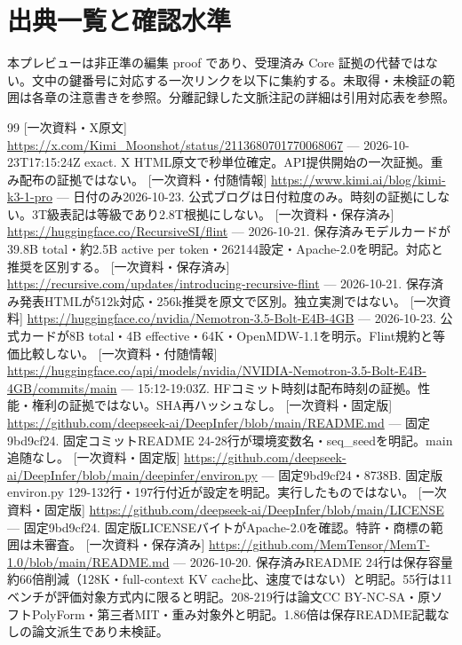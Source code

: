 \documentclass[lualatex,a4paper,10pt]{jlreq}
\begin{document}
\clearpage
\section*{出典一覧と確認水準}
本プレビューは非正準の編集 proof であり、受理済み Core 証拠の代替ではない。文中の鍵番号に対応する一次リンクを以下に集約する。未取得・未検証の範囲は各章の注意書きを参照。分離記録した文脈注記の詳細は引用対応表を参照。

{\footnotesize\setlength{\itemsep}{2pt}\setlength{\parsep}{0pt}
{\footnotesize\setlength{\itemsep}{2pt}\setlength{\parsep}{0pt}
\begin{thebibliography}{99}
 [一次資料・X原文] \url{https://x.com/Kimi_Moonshot/status/2113680701770068067} --- 2026-10-23T17:15:24Z exact. X HTML原文で秒単位確定。API提供開始の一次証拠。重み配布の証拠ではない。
 [一次資料・付随情報] \url{https://www.kimi.ai/blog/kimi-k3-1-pro} --- 日付のみ2026-10-23. 公式ブログは日付粒度のみ。時刻の証拠にしない。3T級表記は等級であり2.8T根拠にしない。
 [一次資料・保存済み] \url{https://huggingface.co/RecursiveSI/flint} --- 2026-10-21. 保存済みモデルカードが39.8B total・約2.5B active per token・262144設定・Apache-2.0を明記。対応と推奨を区別する。
 [一次資料・保存済み] \url{https://recursive.com/updates/introducing-recursive-flint} --- 2026-10-21. 保存済み発表HTMLが512k対応・256k推奨を原文で区別。独立実測ではない。
 [一次資料] \url{https://huggingface.co/nvidia/Nemotron-3.5-Bolt-E4B-4GB} --- 2026-10-23. 公式カードが8B total・4B effective・64K・OpenMDW-1.1を明示。Flint規約と等価比較しない。
 [一次資料・付随情報] \url{https://huggingface.co/api/models/nvidia/NVIDIA-Nemotron-3.5-Bolt-E4B-4GB/commits/main} --- 15:12-19:03Z. HFコミット時刻は配布時刻の証拠。性能・権利の証拠ではない。SHA再ハッシュなし。
 [一次資料・固定版] \url{https://github.com/deepseek-ai/DeepInfer/blob/main/README.md} --- 固定9bd9cf24. 固定コミットREADME 24-28行が環境変数名・seq\_seedを明記。main追随なし。
 [一次資料・固定版] \url{https://github.com/deepseek-ai/DeepInfer/blob/main/deepinfer/environ.py} --- 固定9bd9cf24・8738B. 固定版environ.py 129-132行・197行付近が設定を明記。実行したものではない。
 [一次資料・固定版] \url{https://github.com/deepseek-ai/DeepInfer/blob/main/LICENSE} --- 固定9bd9cf24. 固定版LICENSEバイトがApache-2.0を確認。特許・商標の範囲は未審査。
 [一次資料・保存済み] \url{https://github.com/MemTensor/MemT-1.0/blob/main/README.md} --- 2026-10-20. 保存済みREADME 24行は保存容量約66倍削減（128K・full-context KV cache比、速度ではない）と明記。55行は11ベンチが評価対象方式内に限ると明記。208-219行は論文CC BY-NC-SA・原ソフトPolyForm・第三者MIT・重み対象外と明記。1.86倍は保存README記載なしの論文派生であり未検証。

\end{thebibliography}}}
\end{document}
